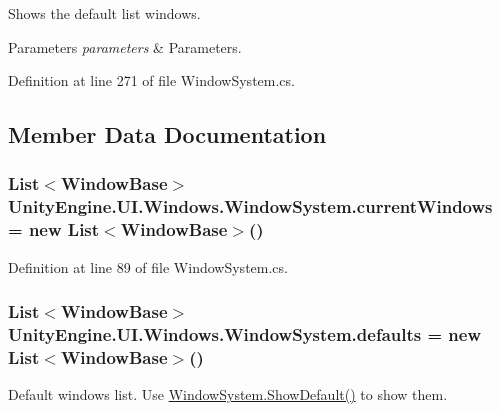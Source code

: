Shows the default list windows. 


\begin{DoxyParams}{Parameters}
{\em parameters} & Parameters.\\
\hline
\end{DoxyParams}


Definition at line 271 of file Window\+System.\+cs.



\subsection{Member Data Documentation}
\hypertarget{class_unity_engine_1_1_u_i_1_1_windows_1_1_window_system_abbd4d2adce8e846491fdcde2bbd09606}{}
\subsubsection[{current\+Windows}]{\setlength{\rightskip}{0pt plus 5cm}List$<${\bf Window\+Base}$>$ Unity\+Engine.\+U\+I.\+Windows.\+Window\+System.\+current\+Windows = new List$<${\bf Window\+Base}$>$()}\label{class_unity_engine_1_1_u_i_1_1_windows_1_1_window_system_abbd4d2adce8e846491fdcde2bbd09606}


Definition at line 89 of file Window\+System.\+cs.

\hypertarget{class_unity_engine_1_1_u_i_1_1_windows_1_1_window_system_abdcb5dd596ef5bb7bdf031372b1b496e}{}
\subsubsection[{defaults}]{\setlength{\rightskip}{0pt plus 5cm}List$<${\bf Window\+Base}$>$ Unity\+Engine.\+U\+I.\+Windows.\+Window\+System.\+defaults = new List$<${\bf Window\+Base}$>$()}\label{class_unity_engine_1_1_u_i_1_1_windows_1_1_window_system_abdcb5dd596ef5bb7bdf031372b1b496e}


Default windows list. Use \hyperlink{class_unity_engine_1_1_u_i_1_1_windows_1_1_window_system_afd54c11d5e6a149247a186ca0cf9c950}{Window\+System.\+Show\+Default()} to show them. 



